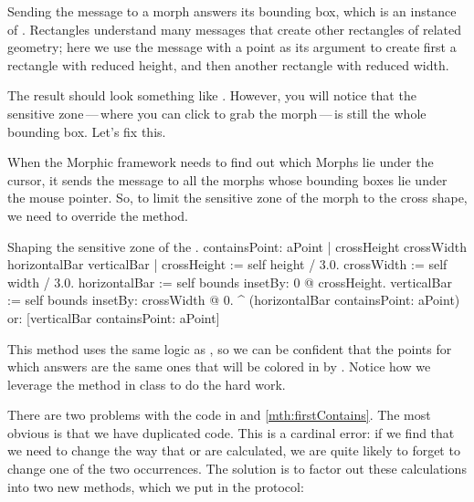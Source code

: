 \documentclass[a4paper,10pt,twoside]{book}
\begin{document}
Sending the  message to a morph answers its bounding box, which is an instance of .  Rectangles understand many messages that create other rectangles of related geometry; here we use the  message with a point as its argument to create first a rectangle with reduced height, and then another rectangle with reduced width.

The result should look something like .
However, you will notice that the sensitive zone\,---\,where you can click to grab the morph\,---\,is still the whole bounding box.  Let's fix this.

When the Morphic framework needs to find out which Morphs lie under the cursor, it sends the message  to all the morphs whose bounding boxes lie under the mouse pointer.
So, to limit the sensitive zone of the morph to the cross shape, we need to override the  method.



\begin{method}[firstContains]{Shaping the sensitive zone of the .}
containsPoint: aPoint
	| crossHeight crossWidth horizontalBar verticalBar |
	crossHeight := self height / 3.0.
	crossWidth := self width / 3.0.
	horizontalBar := self bounds insetBy: 0 @ crossHeight.
	verticalBar := self bounds insetBy: crossWidth @ 0.
	^ (horizontalBar containsPoint: aPoint)
		or: [verticalBar containsPoint: aPoint]
\end{method}

This method uses the same logic as , so we can be confident that the points for which  answers  are the same ones that will be colored in by . 
Notice how we leverage the  method in class  to do the hard work.

There are two problems with the code in  and \ref{mth:firstContains}.
The most obvious is that we have duplicated code.
This is a cardinal error: if we find that we need to change the way that  or  are calculated, we are quite likely to forget to change one of the two occurrences.
The solution is to factor out these calculations into two new methods, which we put in the  protocol:
\end{document}
